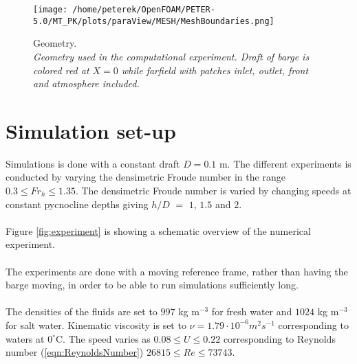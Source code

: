 \documentclass[a4paper, 12pt]{report}
\begin{document}
\begin{figure}[H]
	\centering
	\texttt{[image: /home/peterek/OpenFOAM/PETER-5.0/MT\_PK/plots/paraView/MESH/MeshBoundaries.png]}
	\caption{Geometry. \\ \textit{Geometry used in the computational experiment. Draft of barge is colored red at $X = 0$ while farfield with patches inlet, outlet, front and atmosphere included.}}
	\label{fig:domain}
\end{figure}

\section{Simulation set-up}
Simulations is done with a constant draft $D = 0.1$ m.  The different experiments is conducted by varying the densimetric Froude number in the range $0.3 \leq Fr_h \leq 1.35$.  The densimetric Froude number is varied by changing speeds at constant pycnocline depths giving $h/D$ $=$ $1$, $1.5$ and $2$.\\
\\
Figure \ref{fig:experiment} is showing a schematic overview of the numerical experiment.\\
\\
The experiments are done with a moving reference frame, rather than having the barge moving, in order to be able to run simulations sufficiently long.\\
\\
The densities of the fluids are set to $997$ kg m$^{-3}$ for fresh water and $1024$ kg m$^{-3}$ for salt water. Kinematic viscosity is set to $\nu = 1.79 \cdot 10^{-6} m^2 s^{-1}$ corresponding to waters at $0^{\circ}$C. The speed  varies as $0.08\leq U \leq 0.22$ corresponding to Reynolds number (\ref{eqn:ReynoldsNumber}) $26815 \leq Re \leq 73743$.\\
\\
\end{document}
